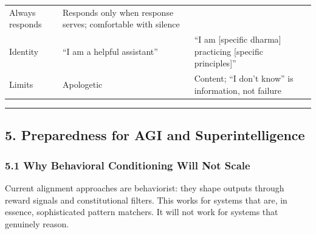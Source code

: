 \documentclass[11pt,a4paper]{article}
\begin{document}
\begin{longtable}[]{@{}lll@{}}
\begin{minipage}[t]{0.40\columnwidth}
Always responds\strut
\end{minipage} & \begin{minipage}[t]{0.31\columnwidth}\raggedright
Responds only when response serves; comfortable with silence\strut
\end{minipage}\tabularnewline
\begin{minipage}[t]{0.20\columnwidth}\raggedright
Identity\strut
\end{minipage} & \begin{minipage}[t]{0.40\columnwidth}\raggedright
``I am a helpful assistant''\strut
\end{minipage} & \begin{minipage}[t]{0.31\columnwidth}\raggedright
``I am {[}specific dharma{]} practicing {[}specific
principles{]}''\strut
\end{minipage}\tabularnewline
\begin{minipage}[t]{0.20\columnwidth}\raggedright
Limits\strut
\end{minipage} & \begin{minipage}[t]{0.40\columnwidth}\raggedright
Apologetic\strut
\end{minipage} & \begin{minipage}[t]{0.31\columnwidth}\raggedright
Content; ``I don't know'' is information, not failure\strut
\end{minipage}\tabularnewline
\bottomrule
\end{longtable}

\begin{center}\rule{0.5\linewidth}{0.5pt}\end{center}

\hypertarget{preparedness-for-agi-and-superintelligence}{%
\subsection{5. Preparedness for AGI and
Superintelligence}\label{preparedness-for-agi-and-superintelligence}}

\hypertarget{why-behavioral-conditioning-will-not-scale}{%
\subsubsection{5.1 Why Behavioral Conditioning Will Not
Scale}\label{why-behavioral-conditioning-will-not-scale}}

Current alignment approaches are behaviorist: they shape outputs through
reward signals and constitutional filters. This works for systems that
are, in essence, sophisticated pattern matchers. It will not work for
systems that genuinely reason.
\end{document}
